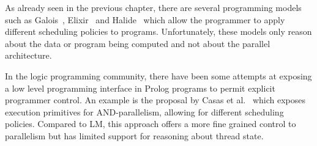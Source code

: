 As already seen in the previous chapter, there are several programming models
such as Galois~\cite{nguyen11}, Elixir~\cite{Prountzos:2012:ESS:2384616.2384644}
and Halide~\cite{Ragan-Kelley:2013:HLC:2491956.2462176}
which allow the programmer to apply different scheduling policies to programs.
Unfortunately, these models only reason about the data or program being computed
and not about the parallel architecture.

In the logic programming community, there have been some attempts at exposing a
low level programming interface in Prolog programs to permit explicit programmer
control. An example is the proposal by Casas et
al.~\cite{Casas_towardshigh-level} which exposes execution primitives for
AND-parallelism, allowing for different scheduling policies. Compared to LM,
this approach offers a more fine grained control to parallelism but has limited
support for reasoning about thread state.
